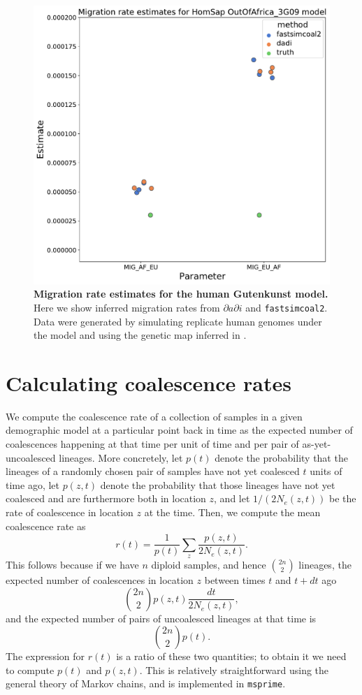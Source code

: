 \documentclass[12pt,halfline,a4paper]{ouparticle}
\newcommand{\stopsupplement}{%
        \setcounter{table}{0}
        \renewcommand{\thetable}{\arabic{table}}%
        \renewcommand{\theHtable}{X\thetable}
        \setcounter{figure}{0}
        \renewcommand{\thefigure}{\arabic{figure}}%
        \renewcommand{\theHfigure}{X\thefigure}
     }
\newcommand{\dadi}{$\partial a \partial i$\xspace}
\newcommand{\fastsimcoal}{\texttt{fastsimcoal2}\xspace}
\begin{document}
\begin{figure}
\begin{center}
\includegraphics[width=0.8\linewidth]{display_items/homsap_migration_rates.pdf}
\caption{\textbf{Migration rate estimates for the human Gutenkunst model.}
Here we show inferred migration rates from \dadi and \fastsimcoal.
Data were generated by simulating
replicate human genomes under the \cite{gutenkunst2009inferring} model and using the genetic map
inferred in \cite{international2007second}.}
\label{fig:homsap_mig_rates}
\end{center}
\end{figure}


\stopsupplement

\appendix

\section*{Calculating coalescence rates}

We compute the coalescence rate of a collection of samples in a given demographic model
at a particular point back in time
as the expected number of coalescences happening at that time
per unit of time and per pair of as-yet-uncoalesced lineages.
More concretely,
let $p(t)$ denote the probability that the lineages of a randomly chosen pair of samples
have not yet coalesced $t$ units of time ago,
let $p(z, t)$ denote the probability that those lineages have not yet coalesced
and are furthermore both in location $z$,
and let $1/(2 N_e(z,t))$ be the rate of coalescence in location $z$ at the time.
Then, we compute the mean coalescence rate as
$$  r(t)  = \frac{1}{p(t)} \sum_z \frac{p(z,t)}{2N_e(z,t)} . $$
This follows because if we have $n$ diploid samples, and hence $\binom{2n}{2}$ lineages,
the expected number of coalescences in location $z$ between times $t$ and $t+dt$ ago
$$
\binom{2n}{2} p(z,t) \frac{ dt }{ 2 N_e(z,t) },
$$
and the expected number of pairs of uncoalesced lineages at that time is
$$
\binom{2n}{2} p(t) .
$$
The expression for $r(t)$ is a ratio of these two quantities;
to obtain it we need to compute $p(t)$ and $p(z,t)$.
This is relatively straightforward
using the general theory of Markov chains, and is implemented in \texttt{msprime}.
\end{document}
